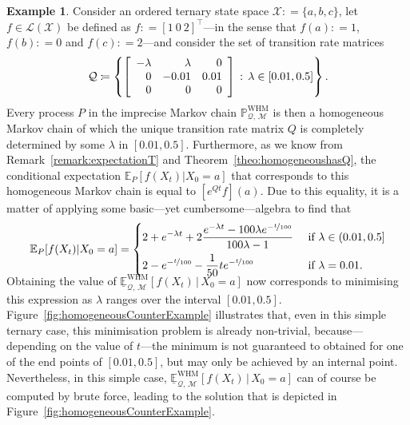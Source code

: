 \documentclass[10pt,a4paper]{paper}
\theoremstyle{definition}
\newtheorem{exmp}{Example}%
\newcommand{\states}{\mathcal{X}}
\newcommand{\processes}{\mathbb{P}}
\newcommand{\whmprocesses}{\processes^{\mathrm{WHM}}}
\newcommand{\gambles}{\mathcal{L}}
\newcommand{\gamblesX}{\gambles(\states)}
\newcommand{\rateset}{\mathcal{Q}}
\newcommand{\coloneqq}{:\!=}
\begin{document}
\begin{exmp}\label{ex:homogeneousexample}
Consider an ordered ternary state space $\states\coloneqq \{a,b,c\}$,  let $f\in\gamblesX$ be defined as $f\coloneqq [1~0~2]^\top$---in the sense that $f(a)\coloneqq1$, $f(b)\coloneqq0$ and $f(c)\coloneqq2$---and consider the set of transition rate matrices
\vspace{4pt}
\begin{equation*}
\rateset \coloneqq \left\{ \left[\begin{array}{rrr}
-\lambda & \lambda & 0 \\
0 & -0.01 & 0.01 \\
0 & 0 & 0
\end{array}\right] \,:\,\lambda\in[0.01,0.5]\right\}.
\vspace{4pt}
\end{equation*}
Every process $P$ in the imprecise Markov chain $\whmprocesses_{\rateset,\,\mathcal{M}}$ is then a homogeneous Markov chain of which the unique transition rate matrix $Q$ is completely determined by some $\lambda$ in $[0.01,0.5]$. Furthermore, as we know from Remark~\ref{remark:expectationT} and Theorem~\ref{theo:homogeneoushasQ}, the conditional expectation $\mathbb{E}_P[f(X_t)\vert X_0=a]$ that corresponds to this homogeneous Markov chain is equal to $[e^{Q t}f](a)$. Due to this equality, it is a matter of applying some basic---yet cumbersome---algebra to find that 
\begin{align*}
\mathbb{E}_P[f(X_t)\vert X_0=a]
=
\begin{cases}
\displaystyle
2+e^{-\lambda t}+2\frac{e^{-\lambda t}-100\lambda e^{-\nicefrac{t}{100}}}{100\lambda-1}&\text{ if $\lambda\in(0.01,0.5]$}\\[8pt]
\displaystyle
2-e^{-\nicefrac{t}{100}}-\frac{1}{50}te^{-\nicefrac{t}{100}}&\text{ if $\lambda=0.01$.}
\end{cases}\\[-10pt]
\end{align*}
Obtaining the value of $\underline{\mathbb{E}}_{\rateset,\,\mathcal{M}}^{\mathrm{WHM}}[f(X_t)\,\vert\,X_0=a]$ now corresponds to minimising this expression as $\lambda$ ranges over the interval $[0.01,0.5]$. Figure~\ref{fig:homogeneousCounterExample} illustrates that, even in this simple ternary case, this minimisation problem is already non-trivial, because---depending on the value of $t$---the minimum is not guaranteed to obtained for one of the end points of $[0.01,0.5]$, but may only be achieved by an internal point. Nevertheless, in this simple case, $\underline{\mathbb{E}}_{\rateset,\,\mathcal{M}}^{\mathrm{WHM}}[f(X_t)\,\vert\,X_0=a]$ can of course be computed by brute force, leading to the solution that is depicted in Figure~\ref{fig:homogeneousCounterExample}. 


\end{exmp}
\end{document}
